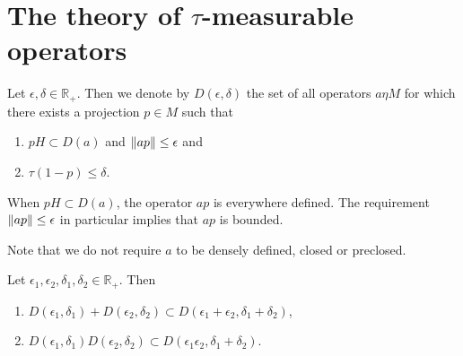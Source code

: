 \section{The theory of $\tau$-measurable operators}
\begin{definition}
    Let $\epsilon,\delta\in \mathbb{R}_+$. Then we denote by $D(\epsilon,\delta)$ the set of all operators $a\eta M$ for which there exists a projection $p\in M$ such that
    \begin{enumerate}
        \item $pH \subset D(a)$ and $\norm{ap}\leq \epsilon$ and
        \item $\tau(1-p)\leq \delta$.
    \end{enumerate}
\end{definition}
When $pH\subset D(a)$, the operator $ap$ is everywhere defined. The requirement $\norm{ap}\leq \epsilon$ in particular implies that $ap$ is bounded.\par
Note that we do not require $a$ to be densely defined, closed or preclosed.
\begin{proposition}\label{prop: 5}
    Let $\epsilon_1,\epsilon_2,\delta_1,\delta_2\in \mathbb{R}_+$. Then
    \begin{enumerate}
        \item $D(\epsilon_1,\delta_1)+D(\epsilon_2,\delta_2)\subset D(\epsilon_1+\epsilon_2,\delta_1+\delta_2)$,
        \item $D(\epsilon_1,\delta_1)D(\epsilon_2,\delta_2)\subset D(\epsilon_1\epsilon_2,\delta_1+\delta_2)$.
    \end{enumerate}
\end{proposition}
